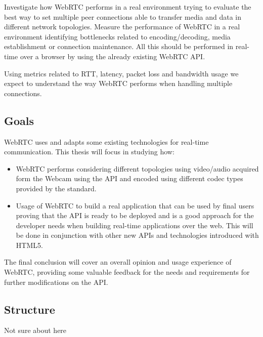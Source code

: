 Investigate how WebRTC performs in a real environment trying to evaluate the best way to set multiple peer connections able to transfer media and data in different network topologies. Measure the performance of WebRTC in a real environment identifying bottlenecks related to encoding/decoding, media establishment or connection maintenance. All this should be performed in real-time over a browser by using the already existing WebRTC API.

Using metrics related to RTT, latency, packet loss and bandwidth usage we expect to understand the way WebRTC performs when handling multiple connections.

\subsection{Goals}

WebRTC uses and adapts some existing technologies for real-time communication. This thesis will focus in studying how:

\begin{itemize}
	\item WebRTC performs considering different topologies using video/audio acquired form the Webcam using the API and encoded using different codec types provided by the standard.

	\item Usage of WebRTC to build a real application that can be used by final users proving that the API is ready to be deployed and is a good approach for the developer needs when building real-time applications over the web. This will be done in conjunction with other new APIs and technologies introduced with HTML5.
\end{itemize}

The final conclusion will cover an overall opinion and usage experience of WebRTC, providing some valuable feedback for the needs and requirements for further modifications on the API.

\subsection{Structure}

Not sure about here